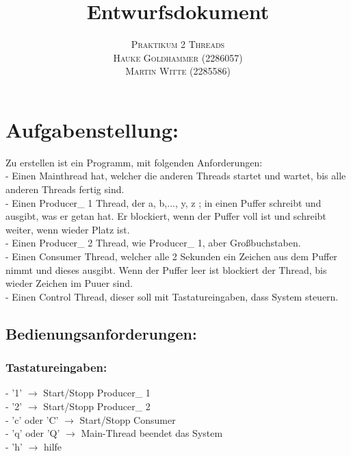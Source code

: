 \documentclass[paper=a4, fontsize=12pt]{article}
\title{\vspace{-15mm}\fontsize{24pt}{10pt}\selectfont\textbf{Entwurfsdokument}} %
\author{
    \large
    {\textsc{Praktikum 2 Threads}}\\[2mm]
    {\textsc{Hauke Goldhammer (2286057)}}\\[2mm]
    {\textsc{Martin Witte (2285586)}}\\[2mm]
}
\begin{document}
\maketitle %
\thispagestyle{fancy} %

\section{Aufgabenstellung:}
Zu erstellen ist ein Programm, mit folgenden Anforderungen:\\
- Einen Mainthread hat, welcher die anderen Threads startet und wartet, bis alle anderen Threads fertig sind.\\
- Einen Producer\_ 1 Thread, der a, b,..., y, z ; in einen Puffer schreibt und ausgibt, was er getan hat. Er blockiert, wenn der Puffer voll ist und schreibt weiter, wenn wieder Platz ist.\\
- Einen Producer\_ 2 Thread, wie Producer\_ 1, aber Großbuchstaben.\\
- Einen Consumer Thread, welcher alle 2 Sekunden ein Zeichen aus dem Puffer nimmt und dieses ausgibt. Wenn der Puffer leer ist blockiert der Thread, bis wieder Zeichen im Puuer sind.\\
- Einen Control Thread, dieser soll mit Tastatureingaben, dass System steuern.

\subsection{Bedienungsanforderungen:}
\subsubsection{Tastatureingaben:}
- '1' $\rightarrow$ Start/Stopp Producer\_ 1\\
- '2' $\rightarrow$ Start/Stopp Producer\_ 2\\
- 'c' oder 'C' $\rightarrow$ Start/Stopp Consumer\\
- 'q' oder 'Q' $\rightarrow$ Main-Thread beendet das System\\
- 'h' $\rightarrow$ hilfe\\
\end{document}
